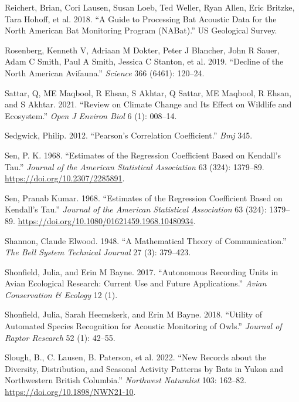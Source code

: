 \documentclass[
  letterpaper,
  DIV=11,
  numbers=noendperiod]{scrartcl}
\newlength{\cslhangindent}
\newenvironment{CSLReferences}[2] %
 {\begin{list}{}{%
  \setlength{\itemindent}{0pt}
  \setlength{\leftmargin}{0pt}
  \setlength{\parsep}{0pt}
  \ifodd #1
   \setlength{\leftmargin}{\cslhangindent}
   \setlength{\itemindent}{-1\cslhangindent}
  \fi
  \setlength{\itemsep}{#2\baselineskip}}}
 {\end{list}}
\begin{document}
\begin{CSLReferences}{1}{0}
Reichert, Brian, Cori Lausen, Susan Loeb, Ted Weller, Ryan Allen, Eric
Britzke, Tara Hohoff, et al. 2018. {``A Guide to Processing Bat Acoustic
Data for the North American Bat Monitoring Program (NABat).''} US
Geological Survey.

Rosenberg, Kenneth V, Adriaan M Dokter, Peter J Blancher, John R Sauer,
Adam C Smith, Paul A Smith, Jessica C Stanton, et al. 2019. {``Decline
of the North American Avifauna.''} \emph{Science} 366 (6461): 120--24.

Sattar, Q, ME Maqbool, R Ehsan, S Akhtar, Q Sattar, ME Maqbool, R Ehsan,
and S Akhtar. 2021. {``Review on Climate Change and Its Effect on
Wildlife and Ecosystem.''} \emph{Open J Environ Biol} 6 (1): 008--14.

Sedgwick, Philip. 2012. {``Pearson's Correlation Coefficient.''}
\emph{Bmj} 345.

Sen, P. K. 1968. {``Estimates of the Regression Coefficient Based on
Kendall's Tau.''} \emph{Journal of the American Statistical Association}
63 (324): 1379--89. \url{https://doi.org/10.2307/2285891}.

Sen, Pranab Kumar. 1968. {``Estimates of the Regression Coefficient
Based on Kendall's Tau.''} \emph{Journal of the American Statistical
Association} 63 (324): 1379--89.
\url{https://doi.org/10.1080/01621459.1968.10480934}.

Shannon, Claude Elwood. 1948. {``A Mathematical Theory of
Communication.''} \emph{The Bell System Technical Journal} 27 (3):
379--423.

Shonfield, Julia, and Erin M Bayne. 2017. {``Autonomous Recording Units
in Avian Ecological Research: Current Use and Future Applications.''}
\emph{Avian Conservation \& Ecology} 12 (1).

Shonfield, Julia, Sarah Heemskerk, and Erin M Bayne. 2018. {``Utility of
Automated Species Recognition for Acoustic Monitoring of Owls.''}
\emph{Journal of Raptor Research} 52 (1): 42--55.

Slough, B., C. Lausen, B. Paterson, et al. 2022. {``New Records about
the Diversity, Distribution, and Seasonal Activity Patterns by Bats in
Yukon and Northwestern British Columbia.''} \emph{Northwest Naturalist}
103: 162--82. \url{https://doi.org/10.1898/NWN21-10}.


\end{CSLReferences}
\end{document}
